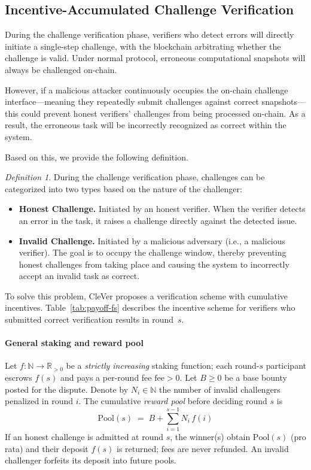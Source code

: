 \documentclass[3p]{elsarticle}
\theoremstyle{remark}
\newtheorem{definition}{Definition}
\begin{document}
\subsection{Incentive-Accumulated Challenge Verification}

During the challenge verification phase, verifiers who detect errors will directly initiate a single-step challenge, with the blockchain arbitrating whether the challenge is valid. Under normal protocol, erroneous computational snapshots will always be challenged on-chain.

However, if a malicious attacker continuously occupies the on-chain challenge interface—meaning they repeatedly submit challenges against correct snapshots—this could prevent honest verifiers' challenges from being processed on-chain. As a result, the erroneous task will be incorrectly recognized as correct within the system.

Based on this, we provide the following definition.

\begin{definition}
    During the challenge verification phase, challenges can be categorized into two types based on the nature of the challenger:
    \begin{itemize}
        \item \textbf{Honest Challenge.} \textnormal{ Initiated by an honest verifier. When the verifier detects an error in the task, it raises a challenge directly against the detected issue. }
        \item \textbf{Invalid Challenge.} \textnormal{ Initiated by a malicious adversary (i.e., a malicious verifier). The goal is to occupy the challenge window, thereby preventing honest challenges from taking place and causing the system to incorrectly accept an invalid task as correct. }
    \end{itemize}
\end{definition}

To solve this problem, CleVer proposes a verification scheme with cumulative incentives. Table~\ref{tab:payoff-fs} describes the incentive scheme for verifiers who submitted correct verification results in round~$s$.


\paragraph{General staking and reward pool}
Let $f:\mathbb{N}\to\mathbb{R}_{>0}$ be a \emph{strictly increasing} staking function; each round-$s$ participant escrows $f(s)$ and pays a per-round fee $\mathrm{fee}>0$. Let $B\ge0$ be a base bounty posted for the dispute. Denote by $N_i\in\mathbb{N}$ the number of invalid challengers penalized in round $i$. The cumulative \emph{reward pool} before deciding round $s$ is
\[
\mathrm{Pool}(s)\;=\;B+\sum_{i=1}^{s-1} N_i\,f(i)
\]
If an honest challenge is admitted at round $s$, the winner(s) obtain $\mathrm{Pool}(s)$ (pro rata) and their deposit $f(s)$ is returned; fees are never refunded. An invalid challenger forfeits its deposit into future pools.
\end{document}
